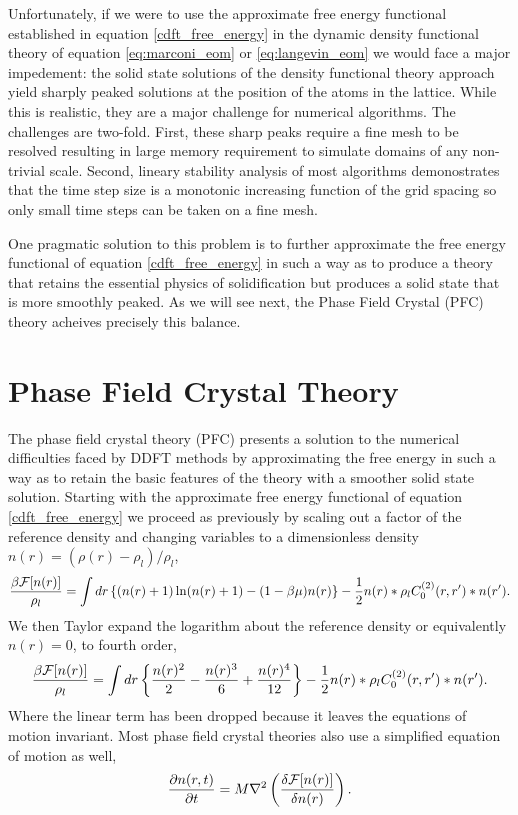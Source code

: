 Unfortunately, if we were to use the approximate free energy functional
established in equation \ref{cdft_free_energy} in the dynamic density
functional theory of equation \ref{eq:marconi_eom} or \ref{eq:langevin_eom} we
would face a major impedement: the solid state solutions of the density
functional theory approach yield sharply peaked solutions at the position of
the atoms in the lattice. While this is realistic, they are a major challenge
for numerical algorithms. The challenges are two-fold. First, these sharp peaks
require a fine mesh to be resolved resulting in large memory requirement to
simulate domains of any non-trivial scale. Second, lineary stability analysis
of most algorithms demonostrates that the time step size is a monotonic
increasing function of the grid spacing so only small time steps can be taken
on a fine mesh.

One pragmatic solution to this problem is to further approximate the free
energy functional of equation \ref{cdft_free_energy} in such a way as to
produce a theory that retains the essential physics of solidification but
produces a solid state that is more smoothly peaked. As we will see next,
the Phase Field Crystal (PFC) theory acheives precisely this balance.

\section{Phase Field Crystal Theory} %

The phase field crystal theory (PFC) presents a solution to the numerical
difficulties faced by DDFT methods by approximating the free energy in such a
way as to retain the basic features of the theory with a smoother solid state
solution. Starting with the approximate free energy functional of equation
\ref{cdft_free_energy} we proceed as previously by scaling out a factor of the
reference density and changing variables to a dimensionless density $n(r) =
(\rho(r) - \rho_l) / \rho_l$,
%
\begin{equation}
    \frac{\beta \mathcal{F}[n(r)]}{\rho_l} = 
        \int dr \left\lbrace (n(r) + 1) \ln( n(r) + 1) - (1 - \beta\mu)n(r) \right\rbrace
        - \frac{1}{2} n(r) \ast \rho_l C^{(2)}_0(r, r^\prime) \ast n(r^\prime).
\end{equation}
%
We then Taylor expand the logarithm about the reference density or equivalently
$n(r) = 0$, to fourth order,
%
\begin{equation}
    \label{pfc_free_energy} 
    \frac{\beta \mathcal{F}[n(r)]}{\rho_l} =
        \int dr \left\lbrace \frac{n(r)^2}{2} - \frac{n(r)^3}{6} + \frac{n(r)^4}{12} \right\rbrace
        -\frac{1}{2} n(r) \ast \rho_l C^{(2)}_0(r, r^\prime) \ast n(r^\prime).
\end{equation}
%
Where the linear term has been dropped because it leaves the equations of
motion invariant.  Most phase field crystal theories also use a simplified
equation of motion as well,
%
\begin{equation}
    \label{pfc_eom}
    \frac{\partial n(r, t)}{\partial t} = M \nabla^2 \left(\frac{\delta \mathcal{F}[n(r)]}{\delta n(r)}\right).
\end{equation}
%
